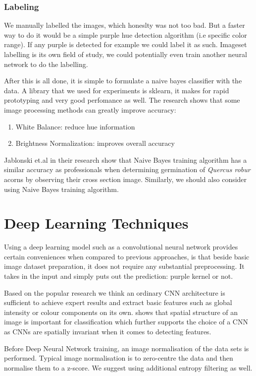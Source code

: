 \documentclass[letterpaper, 10 pt, conference]{ieeeconf}  %
\begin{document}
\subsubsection{Labeling}
We manually labelled the images, which honeslty was not too bad. But a faster way to do it would be a simple purple hue detection algorithm (i.e specific color range). If any purple is detected for example we could label it as such. Imageset labelling is its own field of study, we could potentially even train another neural network to do the labelling. 

After this is all done, it is simple to formulate a naive bayes classifier with the data. A library that we used for experiments is sklearn, it makes for rapid prototyping and very good perfomance as well. The research shows that some image processing methods can greatly improve accuracy: 
\begin{enumerate}
    \item White Balance: reduce hue information
    \item Brightness Normalization: improves overall accuracy 
\end{enumerate}
Jablonski et.al in their research show that Naive Bayes training algorithm has a similar accuracy as professionals when determining germination of \textit{Quercus robur} acorns by observing their cross section image\cite{Jablonski2016ColourBasedBD}. Similarly, we should also consider using Naive Bayes training algorithm.

\section{Deep Learning Techniques}

Using a deep learning model such as a convolutional neural network provides certain conveniences when compared to previous approaches, is that beside basic image dataset preparation, it does not require any substantial preprocessing. It takes in the input and simply puts out the prediction: purple kernel or not. 

Based on the popular research we think an ordinary CNN architecture is sufficient to achieve expert results and extract basic features such as global intensity or colour components on its own. \cite{DBLP:journals/cea/PrzybyloJ19} shows that spatial structure of an image is important for classification which further supports the choice of a CNN as CNNs are spatially invariant when it comes to detecting features. 


Before Deep Neural Network training, an image normalisation of the data sets is performed. Typical image normalisation is to zero-centre the data and then normalise them to a z-score. We suggest using additional entropy filtering as well. 
\end{document}

